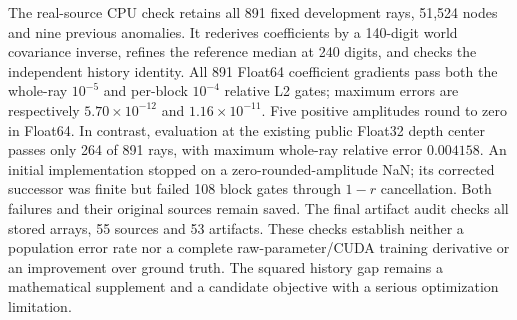 \documentclass[11pt,a4paper]{article}
\begin{document}
The real-source CPU check retains all 891 fixed development rays,
51,524 nodes and nine previous anomalies. It rederives coefficients
by a 140-digit world covariance inverse, refines the reference median
at 240 digits, and checks the independent history identity. All 891
Float64 coefficient gradients pass both the whole-ray $10^{-5}$ and
per-block $10^{-4}$ relative L2 gates; maximum errors are respectively
$5.70\times10^{-12}$ and $1.16\times10^{-11}$. Five positive
amplitudes round to zero in Float64. In contrast, evaluation at the
existing public Float32 depth center passes only 264 of 891 rays,
with maximum whole-ray relative error $0.004158$.
An initial implementation stopped on a zero-rounded-amplitude NaN;
its corrected successor was finite but failed 108 block gates through
$1-r$ cancellation. Both failures and their original sources remain
saved. The final artifact audit checks all stored arrays, 55 sources
and 53 artifacts. These checks establish neither a population error
rate nor a complete raw-parameter/CUDA training derivative or an
improvement over ground truth. The squared history gap remains a
mathematical supplement and a candidate objective with a serious
optimization limitation.
\end{document}
